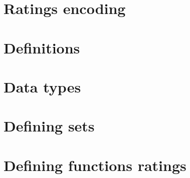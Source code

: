 
\section*{Ratings encoding}

\vfill
\section*{Definitions}

\vfill
\section*{Data types}

\vfill
\section*{Defining sets}

\vfill
\section*{Defining functions ratings}

\vfill
